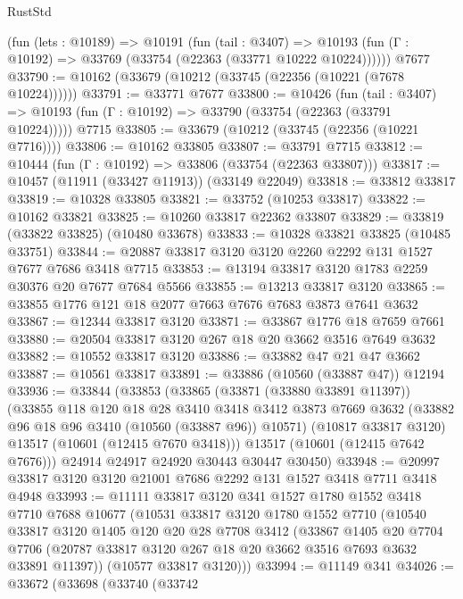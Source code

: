 \begin{lexlean}{RustStd}
\begin{coremodule}
    (fun (lets : @10189) =>
    @10191
      (fun (tail : @3407) =>
      @10193 (fun (Γ : @10192) => @33769 (@33754 (@22363 (@33771 @10222 @10224))))))
    @7677
@33790 := @10162 (@33679 (@10212 (@33745 (@22356 (@10221 (@7678 @10224))))))
@33791 := @33771 @7677
@33800 := @10426
    (fun (tail : @3407) => @10193 (fun (Γ : @10192) => @33790 (@33754 (@22363 (@33791 @10224)))))
    @7715
@33805 := @33679 (@10212 (@33745 (@22356 (@10221 @7716))))
@33806 := @10162 @33805
@33807 := @33791 @7715
@33812 := @10444 (fun (Γ : @10192) => @33806 (@33754 (@22363 @33807)))
@33817 := @10457 (@11911 (@33427 @11913)) (@33149 @22049)
@33818 := @33812 @33817
@33819 := @10328 @33805
@33821 := @33752 (@10253 @33817)
@33822 := @10162 @33821
@33825 := @10260 @33817 @22362 @33807
@33829 := @33819 (@33822 @33825) (@10480 @33678)
@33833 := @10328 @33821 @33825 (@10485 @33751)
@33844 := @20887 @33817 @3120 @3120 @2260 @2292 @131 @1527 @7677 @7686 @3418 @7715
@33853 := @13194 @33817 @3120 @1783 @2259 @30376 @20 @7677 @7684 @5566
@33855 := @13213 @33817 @3120
@33865 := @33855 @1776 @121 @18 @2077 @7663 @7676 @7683 @3873 @7641 @3632
@33867 := @12344 @33817 @3120
@33871 := @33867 @1776 @18 @7659 @7661
@33880 := @20504 @33817 @3120 @267 @18 @20 @3662 @3516 @7649 @3632
@33882 := @10552 @33817 @3120
@33886 := @33882 @47 @21 @47 @3662
@33887 := @10561 @33817
@33891 := @33886 (@10560 (@33887 @47)) @12194
@33936 := @33844
    (@33853
      (@33865
        (@33871 (@33880 @33891 @11397))
        (@33855
          @118
          @120
          @18
          @28
          @3410
          @3418
          @3412
          @3873
          @7669
          @3632
          (@33882 @96 @18 @96 @3410 (@10560 (@33887 @96)) @10571)
          (@10817 @33817 @3120)
          @13517
          (@10601 (@12415 @7670 @3418)))
        @13517
        (@10601 (@12415 @7642 @7676)))
      @24914
      @24917
      @24920
      @30443
      @30447
      @30450)
@33948 := @20997 @33817 @3120 @3120 @21001 @7686 @2292 @131 @1527 @3418 @7711 @3418 @4948
@33993 := @11111
    @33817
    @3120
    @341
    @1527
    @1780
    @1552
    @3418
    @7710
    @7688
    @10677
    (@10531
      @33817
      @3120
      @1780
      @1552
      @7710
      (@10540
        @33817
        @3120
        @1405
        @120
        @20
        @28
        @7708
        @3412
        (@33867
          @1405
          @20
          @7704
          @7706
          (@20787 @33817 @3120 @267 @18 @20 @3662 @3516 @7693 @3632 @33891 @11397))
        (@10577 @33817 @3120)))
@33994 := @11149 @341
@34026 := @33672
    (@33698
      (@33740
        (@33742

\end{coremodule}
\end{lexlean}
